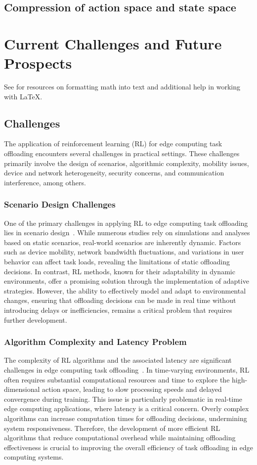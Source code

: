\documentclass[journal]{IEEEtran}
\begin{document}
\subsection{Compression of action space and state space}

\section{Current Challenges and Future Prospects}
See for resources on formatting math into text and additional help in working with \LaTeX .

\subsection{Challenges}

The application of reinforcement learning (RL) for edge computing task offloading encounters several challenges in practical settings. These challenges primarily involve the design of scenarios, algorithmic complexity, mobility issues, device and network heterogeneity, security concerns, and communication interference, among others.

\subsubsection{Scenario Design Challenges}
One of the primary challenges in applying RL to edge computing task offloading lies in scenario design~\cite{zhou06}. While numerous studies rely on simulations and analyses based on static scenarios, real-world scenarios are inherently dynamic. Factors such as device mobility, network bandwidth fluctuations, and variations in user behavior can affect task loads, revealing the limitations of static offloading decisions. In contrast, RL methods, known for their adaptability in dynamic environments, offer a promising solution through the implementation of adaptive strategies. However, the ability to effectively model and adapt to environmental changes, ensuring that offloading decisions can be made in real time without introducing delays or inefficiencies, remains a critical problem that requires further development.

\subsubsection{Algorithm Complexity and Latency Problem}
The complexity of RL algorithms and the associated latency are significant challenges in edge computing task offloading~\cite{zhou07}. In time-varying environments, RL often requires substantial computational resources and time to explore the high-dimensional action space, leading to slow processing speeds and delayed convergence during training. This issue is particularly problematic in real-time edge computing applications, where latency is a critical concern. Overly complex algorithms can increase computation times for offloading decisions, undermining system responsiveness. Therefore, the development of more efficient RL algorithms that reduce computational overhead while maintaining offloading effectiveness is crucial to improving the overall efficiency of task offloading in edge computing systems.
\end{document}
